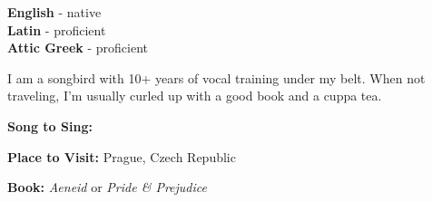\begin{minipage}[t]{0.2\textwidth}
	\vspace{-\baselineskip}


	\textbf{English} - native\\
	\textbf{Latin} - proficient\\
	\textbf{Attic Greek} - proficient
\end{minipage}
\hfill
\begin{minipage}[t]{0.35\textwidth}
	\vspace{-\baselineskip}


	I am a songbird with 10+ years of vocal training under my belt. When not traveling, I'm usually curled up with a good book and a cuppa tea.
\end{minipage}
\hfill
\begin{minipage}[t]{0.35\textwidth}
	\vspace{-\baselineskip}


	\textbf{Song to Sing:} 

	\textbf{Place to Visit:} Prague, Czech Republic

	\textbf{Book:} \textit{Aeneid} or \textit{Pride \& Prejudice}
\end{minipage}